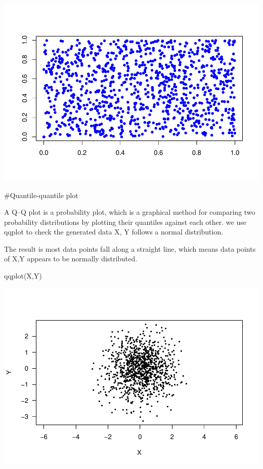 \documentclass[
]{article}
\newenvironment{Shaded}{\begin{snugshade}}{\end{snugshade}}
\newcommand{\FunctionTok}[1]{\textcolor[rgb]{0.00,0.00,0.00}{#1}}
\newcommand{\NormalTok}[1]{#1}
\begin{document}
\includegraphics{TP2_files/figure-latex/unnamed-chunk-3-1.pdf}

\#Quantile-quantile plot

A Q--Q plot is a probability plot, which is a graphical method for
comparing two probability distributions by plotting their quantiles
against each other. we use qqplot to check the generated data X, Y
follows a normal distribution.

The result is most data points fall along a straight line, which means
data points of X,Y appears to be normally distributed.

\begin{Shaded}
\begin{Highlighting}[]
\FunctionTok{qqplot}\NormalTok{(X,Y)}
\end{Highlighting}
\end{Shaded}

\includegraphics{TP2_files/figure-latex/unnamed-chunk-4-1.pdf}
\end{document}
